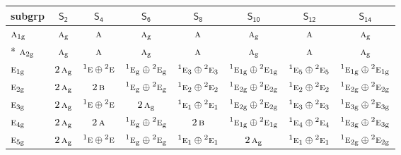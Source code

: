 \documentclass[10pt,a4paper]{article}
\numberwithin{equation}{section}
\newcommand{\grp}[1]{\mathsf{#1}}
\newcommand{\irr}[1]{\text{\normalfont\scshape #1}}
\newcommand{\conjpair}[1]{{}^{#1}}
\newcommand{\ptag}[1]{\mathrm{#1}}
\begin{document}
{\small\begin{longtable}{@{}lccccccc@{}}\toprule
subgrp & \href{S2.pdf}{$\grp{S_{2}}$} & \href{S4.pdf}{$\grp{S_{4}}$} & \href{S6.pdf}{$\grp{S_{6}}$} & \href{S8.pdf}{$\grp{S_{8}}$} & \href{S10.pdf}{$\grp{S_{10}}$} & \href{S12.pdf}{$\grp{S_{12}}$} & \href{S14.pdf}{$\grp{S_{14}}$}\\\midrule\endhead
\bottomrule\endfoot\endlastfoot
$\irr{a}_{1\ptag{g}}$ & $\irr{a}_{\ptag{g}}$ & $\irr{a}$ & $\irr{a}_{\ptag{g}}$ & $\irr{a}$ & $\irr{a}_{\ptag{g}}$ & $\irr{a}$ & $\irr{a}_{\ptag{g}}$\\*
$\irr{a}_{2\ptag{g}}$ & $\irr{a}_{\ptag{g}}$ & $\irr{a}$ & $\irr{a}_{\ptag{g}}$ & $\irr{a}$ & $\irr{a}_{\ptag{g}}$ & $\irr{a}$ & $\irr{a}_{\ptag{g}}$\\
$\irr{e}_{1\ptag{g}}$ & $2\,\irr{a}_{\ptag{g}}$ & $\conjpair{1}\irr{e}\oplus \conjpair{2}\irr{e}$ & $\conjpair{1}\irr{e}_{\ptag{g}}\oplus \conjpair{2}\irr{e}_{\ptag{g}}$ & $\conjpair{1}\irr{e}_{3}\oplus \conjpair{2}\irr{e}_{3}$ & $\conjpair{1}\irr{e}_{1\ptag{g}}\oplus \conjpair{2}\irr{e}_{1\ptag{g}}$ & $\conjpair{1}\irr{e}_{5}\oplus \conjpair{2}\irr{e}_{5}$ & $\conjpair{1}\irr{e}_{1\ptag{g}}\oplus \conjpair{2}\irr{e}_{1\ptag{g}}$\\
$\irr{e}_{2\ptag{g}}$ & $2\,\irr{a}_{\ptag{g}}$ & $2\,\irr{b}$ & $\conjpair{1}\irr{e}_{\ptag{g}}\oplus \conjpair{2}\irr{e}_{\ptag{g}}$ & $\conjpair{1}\irr{e}_{2}\oplus \conjpair{2}\irr{e}_{2}$ & $\conjpair{1}\irr{e}_{2\ptag{g}}\oplus \conjpair{2}\irr{e}_{2\ptag{g}}$ & $\conjpair{1}\irr{e}_{2}\oplus \conjpair{2}\irr{e}_{2}$ & $\conjpair{1}\irr{e}_{2\ptag{g}}\oplus \conjpair{2}\irr{e}_{2\ptag{g}}$\\
$\irr{e}_{3\ptag{g}}$ & $2\,\irr{a}_{\ptag{g}}$ & $\conjpair{1}\irr{e}\oplus \conjpair{2}\irr{e}$ & $2\,\irr{a}_{\ptag{g}}$ & $\conjpair{1}\irr{e}_{1}\oplus \conjpair{2}\irr{e}_{1}$ & $\conjpair{1}\irr{e}_{2\ptag{g}}\oplus \conjpair{2}\irr{e}_{2\ptag{g}}$ & $\conjpair{1}\irr{e}_{3}\oplus \conjpair{2}\irr{e}_{3}$ & $\conjpair{1}\irr{e}_{3\ptag{g}}\oplus \conjpair{2}\irr{e}_{3\ptag{g}}$\\
$\irr{e}_{4\ptag{g}}$ & $2\,\irr{a}_{\ptag{g}}$ & $2\,\irr{a}$ & $\conjpair{1}\irr{e}_{\ptag{g}}\oplus \conjpair{2}\irr{e}_{\ptag{g}}$ & $2\,\irr{b}$ & $\conjpair{1}\irr{e}_{1\ptag{g}}\oplus \conjpair{2}\irr{e}_{1\ptag{g}}$ & $\conjpair{1}\irr{e}_{4}\oplus \conjpair{2}\irr{e}_{4}$ & $\conjpair{1}\irr{e}_{3\ptag{g}}\oplus \conjpair{2}\irr{e}_{3\ptag{g}}$\\
$\irr{e}_{5\ptag{g}}$ & $2\,\irr{a}_{\ptag{g}}$ & $\conjpair{1}\irr{e}\oplus \conjpair{2}\irr{e}$ & $\conjpair{1}\irr{e}_{\ptag{g}}\oplus \conjpair{2}\irr{e}_{\ptag{g}}$ & $\conjpair{1}\irr{e}_{1}\oplus \conjpair{2}\irr{e}_{1}$ & $2\,\irr{a}_{\ptag{g}}$ & $\conjpair{1}\irr{e}_{1}\oplus \conjpair{2}\irr{e}_{1}$ & $\conjpair{1}\irr{e}_{2\ptag{g}}\oplus \conjpair{2}\irr{e}_{2\ptag{g}}$\\

\end{longtable}}
\end{document}
